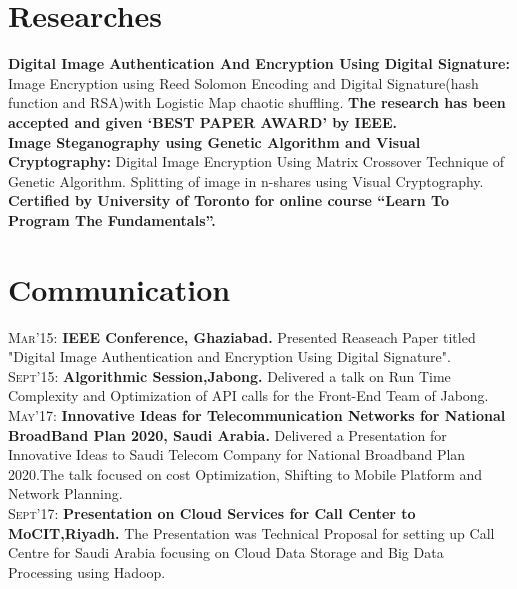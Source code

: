 \documentclass[a4paper,10pt]{article}
\begin{document}
\section{Researches}
\textbf{}
\textbf{Digital Image Authentication And Encryption Using Digital Signature:} \normalsize Image Encryption using Reed Solomon
Encoding and Digital Signature(hash function and RSA)with Logistic Map chaotic shuffling. \textbf{The research has been accepted and given ‘BEST PAPER AWARD’ by IEEE.} \\
\textbf{Image Steganography using Genetic Algorithm and Visual Cryptography: } \normalsize Digital Image Encryption Using Matrix
Crossover Technique of Genetic Algorithm. Splitting of image in n-shares using Visual Cryptography. \\
\textbf{Certified by University of Toronto for online course “Learn To Program The Fundamentals”.\\
}
\section{Communication}
\textsc{Mar'15: }\textbf{IEEE Conference, Ghaziabad.} \normalsize 
Presented Reaseach Paper titled "Digital Image Authentication and Encryption Using Digital Signature". \\
\textsc{Sept'15: }\textbf{Algorithmic Session,Jabong.} \normalsize
Delivered a talk on Run Time Complexity and Optimization of API calls for the Front-End Team of Jabong. \\
\textsc{May'17: }\textbf{Innovative Ideas for Telecommunication Networks for National BroadBand Plan 2020, Saudi Arabia.} Delivered a Presentation for Innovative Ideas to Saudi Telecom Company for National Broadband Plan 2020.The talk focused on cost Optimization, Shifting to Mobile Platform and Network Planning. \\
\textsc{Sept'17: }\textbf{Presentation on Cloud Services for Call Center to MoCIT,Riyadh.} The Presentation was Technical Proposal for setting up Call Centre for Saudi Arabia focusing on Cloud Data Storage and Big Data Processing using Hadoop.\\
\normalsize

\end{document}
